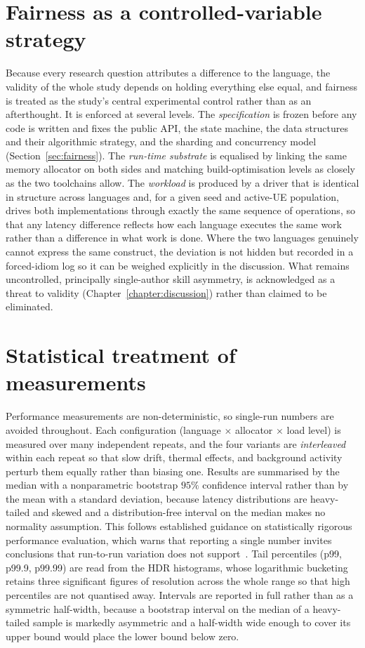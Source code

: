 \documentclass[english,twoside,openright,a4paper,censored,csm,software-track-2020]{HYthesisML}
\begin{document}
\section{Fairness as a controlled-variable strategy}
Because every research question attributes a difference to the language, the validity of the
whole study depends on holding everything else equal, and fairness is treated as the study's
central experimental control rather than as an afterthought. It is enforced at several levels.
The \emph{specification} is frozen before any code is written and fixes the public API, the
state machine, the data structures and their algorithmic strategy, and the sharding and
concurrency model (Section~\ref{sec:fairness}). The \emph{run-time substrate} is equalised by
linking the same memory allocator on both sides and matching build-optimisation levels as
closely as the two toolchains allow. The \emph{workload} is produced by a driver that is
identical in structure across languages and, for a given seed and active-UE population, drives
both implementations through exactly the same sequence of operations, so that any latency
difference reflects how each language executes the same work rather than a difference in what
work is done. Where the two languages genuinely cannot express the same construct, the deviation
is not hidden but recorded in a forced-idiom log so it can be weighed explicitly in the
discussion. What remains uncontrolled, principally single-author skill asymmetry, is
acknowledged as a threat to validity (Chapter~\ref{chapter:discussion}) rather than claimed to
be eliminated.

\section{Statistical treatment of measurements}\label{sec:stats}
Performance measurements are non-deterministic, so single-run numbers are avoided throughout.
Each configuration (language $\times$ allocator $\times$ load level) is measured over many
independent repeats, and the four variants are \emph{interleaved} within each repeat so that
slow drift, thermal effects, and background activity perturb them equally rather than biasing
one. Results are summarised by the median with a nonparametric bootstrap $95\%$ confidence
interval rather than by the mean with a standard deviation, because latency distributions are
heavy-tailed and skewed and a distribution-free interval on the median makes no normality
assumption. This follows established guidance on statistically rigorous performance evaluation,
which warns that reporting a single number invites conclusions that run-to-run variation does
not support~\cite{georges2007rigorous}. Tail percentiles (p99, p99.9, p99.99) are read from the
HDR histograms, whose logarithmic bucketing retains three significant figures of resolution
across the whole range so that high percentiles are not quantised away. Intervals are reported
in full rather than as a symmetric half-width, because a bootstrap interval on the median of a
heavy-tailed sample is markedly asymmetric and a half-width wide enough to cover its upper
bound would place the lower bound below zero.
\end{document}
